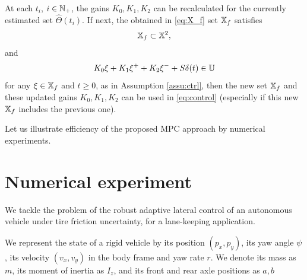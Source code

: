 \documentclass[letterpaper, 10 pt, conference]{ieeeconf}  %
\begin{document}
\begin{remark}
At each $t_{i}$, $i\in\mathbb{N}_{+}$, the gains $K_{0},K_{1},K_{2}$
can be recalculated for the currently estimated set $\hat{\Theta}(t_{i})$.
If next, the obtained in \eqref{eq:X_f} set $\mathbb{X}_{f}$ satisfies 
\[
\mathbb{X}_{f}\subset\mathbb{X}^{2},
\]
and
\[
K_{0}\xi+K_{1}\xi^{+}+K_{2}\xi^{-}+S\delta(t)\in\mathbb{U}
\]
for any $\xi\in\mathbb{X}_{f}$ and $t\geq0$, as in Assumption \ref{assu:ctrl},
then the new set $\mathbb{X}_{f}$ and these updated gains $K_{0},K_{1},K_{2}$
can be used in \eqref{eq:control} (especially if this new $\mathbb{X}_{f}$
includes the previous one).
\end{remark}
Let us illustrate efficiency of the proposed MPC approach by numerical
experiments.

\section{\label{sec:experiments} Numerical experiment}

We tackle the problem of the robust adaptive lateral control of an autonomous vehicle under tire friction uncertainty, for a lane-keeping application.

We represent the state of a rigid vehicle by its position $(p_x, p_y)$, its yaw angle $\psi$, its velocity $(v_x, v_y)$ in the body frame and yaw rate $r$. We denote its mass as $m$, its moment of inertia as $I_z$, and its front and rear axle positions as $a,b$
\end{document}
